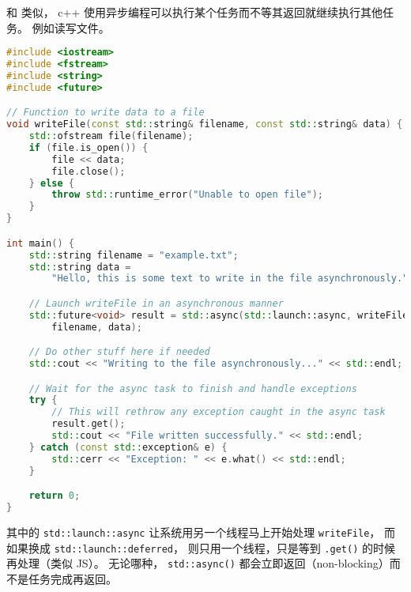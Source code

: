 

\begin{issues}
\issueDraft
\end{issues}

和 类似， c++ 使用异步编程可以执行某个任务而不等其返回就继续执行其他任务。 例如读写文件。

\begin{lstlisting}[language=cpp]
#include <iostream>
#include <fstream>
#include <string>
#include <future>

// Function to write data to a file
void writeFile(const std::string& filename, const std::string& data) {
    std::ofstream file(filename);
    if (file.is_open()) {
        file << data;
        file.close();
    } else {
        throw std::runtime_error("Unable to open file");
    }
}

int main() {
    std::string filename = "example.txt";
    std::string data =
        "Hello, this is some text to write in the file asynchronously.";

    // Launch writeFile in an asynchronous manner
    std::future<void> result = std::async(std::launch::async, writeFile,
        filename, data);

    // Do other stuff here if needed
    std::cout << "Writing to the file asynchronously..." << std::endl;

    // Wait for the async task to finish and handle exceptions
    try {
        // This will rethrow any exception caught in the async task
        result.get();
        std::cout << "File written successfully." << std::endl;
    } catch (const std::exception& e) {
        std::cerr << "Exception: " << e.what() << std::endl;
    }

    return 0;
}
\end{lstlisting}
其中的 \verb`std::launch::async` 让系统用另一个线程马上开始处理 \verb`writeFile`， 而如果换成 \verb`std::launch::deferred`， 则只用一个线程，只是等到 \verb`.get()` 的时候再处理（类似 JS）。 无论哪种， \verb`std::async()` 都会立即返回（non-blocking）而不是任务完成再返回。
